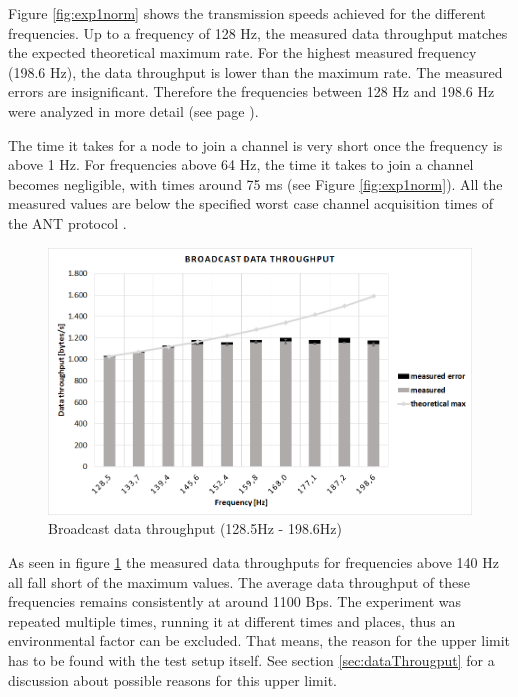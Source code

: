 \begin{description}
	Figure \ref{fig:exp1norm} shows the transmission speeds achieved for the different frequencies. Up to a frequency of 128 Hz, the measured data throughput matches the expected theoretical maximum rate. For the highest measured frequency (198.6 Hz), the data throughput is lower than the maximum rate. The measured errors are insignificant. Therefore the frequencies between 128 Hz and 198.6 Hz were analyzed in more detail (see page \pageref{fig:exp1between}). 
		
	The time it takes for a node to join a channel is very short once the frequency is above 1 Hz. For frequencies above 64 Hz, the time it takes to join a channel becomes negligible, with times around 75 ms (see Figure \ref{fig:exp1norm}). All the measured values are below the specified worst case channel acquisition times of the ANT protocol \cite{AntChan}.
	
	\begin{figure}[H]
		\centering
		\includegraphics[scale=0.5]{content/images/exp1_detail.png}
		\caption{Broadcast data throughput (128.5Hz - 198.6Hz)}\label{fig:exp1between}
	\end{figure}
	As seen in figure \ref{fig:exp1between} the measured data throughputs for frequencies above 140 Hz all fall short of the maximum values. The average data throughput of these frequencies remains consistently at around 1100 Bps. The experiment was repeated multiple times, running it at different times and places, thus an environmental factor can be excluded. That means, the reason for the upper limit has to be found with the test setup itself. See section \ref{sec:dataThrougput} for a discussion about possible reasons for this upper limit.
	

\end{description}
